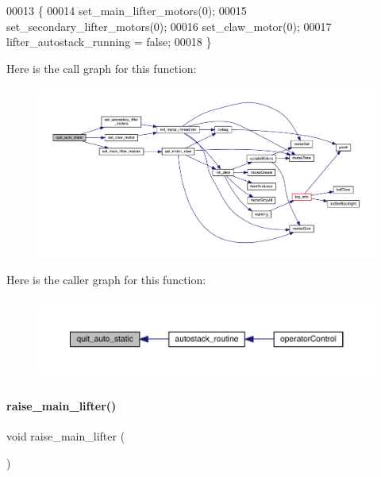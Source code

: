 \begin{DoxyCode}
00013                                       \{
00014   set_main_lifter_motors(0);
00015   set_secondary_lifter_motors(0);
00016   set_claw_motor(0);
00017   lifter_autostack_running = \textcolor{keyword}{false};
00018 \}
\end{DoxyCode}
Here is the call graph for this function\+:
\nopagebreak
\begin{figure}[H]
\begin{center}
\leavevmode
\includegraphics[width=350pt]{lifter_8c_aa4d172cbde795bc13fe6baabd074717e_cgraph}
\end{center}
\end{figure}
Here is the caller graph for this function\+:
\nopagebreak
\begin{figure}[H]
\begin{center}
\leavevmode
\includegraphics[width=350pt]{lifter_8c_aa4d172cbde795bc13fe6baabd074717e_icgraph}
\end{center}
\end{figure}
\mbox{\label{lifter_8c_a2e2bd38b5b8b52378f3510368bf8aa0a}} 
\paragraph{raise\+\_\+main\+\_\+lifter()}
{\footnotesize\ttfamily void raise\+\_\+main\+\_\+lifter (\begin{DoxyParamCaption}{ }\end{DoxyParamCaption})}



